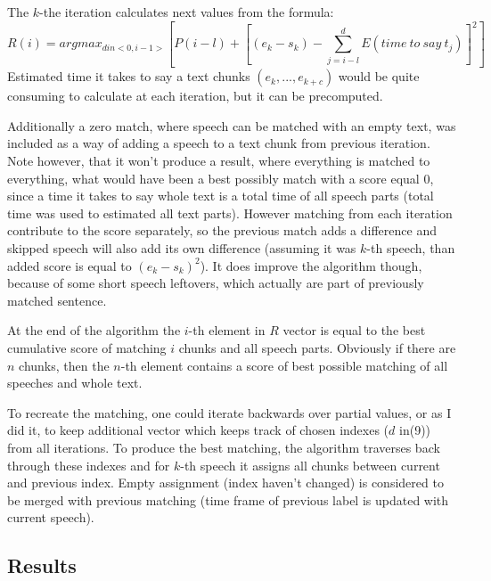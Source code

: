 \documentclass[12pt,a4paper,english]{article}
\begin{document}
The $k$-the iteration calculates next values from the formula:
\begin{equation}
    R(i) = argmax_{d in <0, i - 1>} [P(i-l) + [(e_k - s_k) - \sum_{j = i - l}^d E(time \: to \: say \: t_j)]^2 ]
\end{equation}
Estimated time it takes to say a text chunks $(e_k, ..., e_{k+c})$ would be quite consuming to calculate at each iteration, but it can be precomputed. \newline

Additionally a zero match, where speech can be matched with an empty text, was included as a way of adding a speech to a text chunk from previous iteration.  Note however, that it won't produce a result, where everything is matched to everything, what would have been a best possibly match with a score equal 0, since a time it takes to say whole text is a total time of all speech parts (total time was used to estimated all text parts). \newline
However matching from each iteration contribute to the score separately, so the previous match adds a difference and skipped speech will also add its own difference (assuming it was $k$-th speech, than added score is equal to $(e_k - s_k)^2$). \newline
It does improve the algorithm though, because of some short speech leftovers, which actually are part of previously matched sentence. \newline

\newpage
At the end of the algorithm the $i$-th element in $R$ vector is equal to the best cumulative score of matching $i$ chunks and all speech parts. Obviously if there are $n$ chunks, then the $n$-th element contains a score of best possible matching of all speeches and whole text. \newline

To recreate the matching, one could iterate backwards over partial values, or as I did it, to keep additional vector which keeps track of chosen indexes ($d$ in(9)) from all iterations. To produce the best matching, the algorithm traverses back through these indexes and for $k$-th speech it assigns all chunks between current and previous index. Empty assignment (index haven't changed) is considered to be merged with previous matching (time frame of previous label is updated with current speech). \newline
\newline

\subsection{Results}
\end{document}
